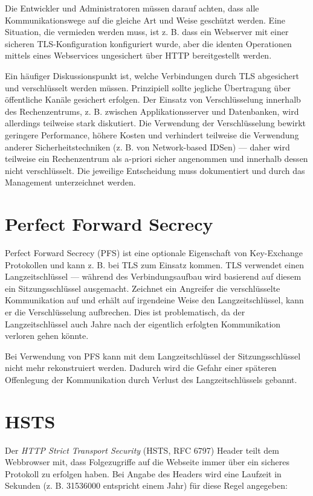 Die Entwickler und Administratoren müssen darauf achten, dass alle Kommunikationswege auf die gleiche Art und Weise geschützt werden. Eine Situation, die vermieden werden muss, ist z. B. dass ein Webserver mit einer sicheren TLS-Konfiguration konfiguriert wurde, aber die identen Operationen mittels eines Webservices ungesichert über HTTP bereitgestellt werden.

Ein häufiger Diskussionspunkt ist, welche Verbindungen durch TLS abgesichert und verschlüsselt werden müssen. Prinzipiell sollte jegliche Übertragung über öffentliche Kanäle gesichert erfolgen. Der Einsatz von Verschlüsselung innerhalb des Rechenzentrums, z. B. zwischen Applikationsserver und Datenbanken, wird allerdings teilweise stark diskutiert. Die Verwendung der Verschlüsselung bewirkt geringere Performance, höhere Kosten und verhindert teilweise die Verwendung anderer Sicherheitstechniken (z. B. von Network-based IDSen) --- daher wird teilweise ein Rechenzentrum als a-priori sicher angenommen und innerhalb dessen nicht verschlüsselt. Die jeweilige Entscheidung muss dokumentiert und durch das Management unterzeichnet werden.

\section{Perfect Forward Secrecy}

Perfect Forward Secrecy (PFS) ist eine optionale Eigenschaft von Key-Exchange Protokollen und kann z. B. bei TLS zum Einsatz kommen. TLS verwendet einen Langzeitschlüssel --- während des Verbindungsaufbau wird basierend auf diesem ein Sitzungsschlüssel ausgemacht. Zeichnet ein Angreifer die verschlüsselte Kommunikation auf und erhält auf irgendeine Weise den Langzeitschlüssel, kann er die Verschlüsselung aufbrechen. Dies ist problematisch, da der Langzeitschlüssel auch Jahre nach der eigentlich erfolgten Kommunikation verloren gehen könnte.

Bei Verwendung von PFS kann mit dem Langzeitschlüssel der Sitzungsschlüssel nicht mehr rekonstruiert werden. Dadurch wird die Gefahr einer späteren Offenlegung der Kommunikation durch Verlust des Langzeitschlüssels gebannt.

\section{HSTS}
\label{hsts}

Der \textit{HTTP Strict Transport Security} (HSTS, RFC 6797) Header teilt dem Webbrowser mit, dass Folgezugriffe auf die Webseite immer über ein sicheres Protokoll zu erfolgen haben. Bei Angabe des Headers wird eine Laufzeit in Sekunden (z. B. 31536000 entspricht einem Jahr) für diese Regel angegeben:

